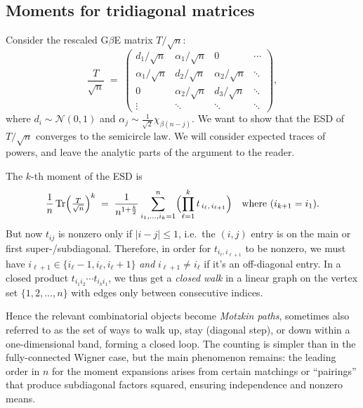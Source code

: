 \documentclass[letterpaper,11pt,oneside,reqno]{article}
\numberwithin{equation}{section}
\theoremstyle{definition}
\begin{document}
\subsection{Moments for tridiagonal matrices}
\label{sub:tridiag-moments}

Consider 
the rescaled 
G$\beta$E
matrix $T/\sqrt{n}$:
\[
  \frac{T}{\sqrt{n}}
  \;=\;
  \begin{pmatrix}
    d_1/\sqrt{n} & \alpha_1/\sqrt{n} & 0 & \cdots \\
    \alpha_1/\sqrt{n} & d_2/\sqrt{n} & \alpha_2/\sqrt{n} & \ddots \\
    0 & \alpha_2/\sqrt{n} & d_3/\sqrt{n} & \ddots \\
    \vdots & \ddots & \ddots & \ddots
  \end{pmatrix},
\]
where $d_i \sim \mathcal{N}(0,1)$ and $\alpha_j \sim \frac{1}{\sqrt 2}\chi_{\beta(n-j)}$.  We want to show that the ESD of $T/\sqrt{n}$ converges to the semicircle law.
We will consider expected traces of powers, and leave the analytic parts of the 
argument to the reader.

The $k$-th moment of the ESD is
\[
  \frac{1}{n}\operatorname{Tr}\Bigl(\tfrac{T}{\sqrt{n}}\Bigr)^k
  \;=\;
  \frac{1}{n^{1 + \frac{k}{2}}}
  \sum_{i_1,\dots,i_k=1}^n 
     \Bigl(\prod_{\ell=1}^k t_{\,i_\ell,\,i_{\ell+1}}\Bigr)
     \quad\text{where }(i_{k+1}=i_1).
\]
But now $t_{ij}$ is nonzero only if $\lvert i-j\rvert \le1$, i.e.\ the $(i,j)$ entry is on the main or first super-/subdiagonal.  Therefore, in order for $t_{i_\ell,i_{\ell+1}}$ to be nonzero, we must have $i_{\ell+1} \in \{i_{\ell}-1,i_{\ell},i_{\ell}+1\}$ \emph{and} $i_{\ell+1} \neq i_\ell$ if it’s an off-diagonal entry.  In a closed product $t_{i_1 i_2}\cdots t_{i_k i_1}$, we thus get a \emph{closed walk} in a linear graph on the vertex set $\{1,2,\dots,n\}$ with edges only between consecutive indices.

Hence the relevant combinatorial objects become \emph{Motzkin paths}, sometimes also referred to as the set of ways to walk up, stay (diagonal step), or down within a one-dimensional band, forming a closed loop.  The counting is simpler than in the fully-connected Wigner case, but the main phenomenon remains: the leading order in $n$ for the moment expansions arises from certain matchings or “pairings” that produce subdiagonal factors squared, ensuring independence and nonzero means.  
\end{document}
